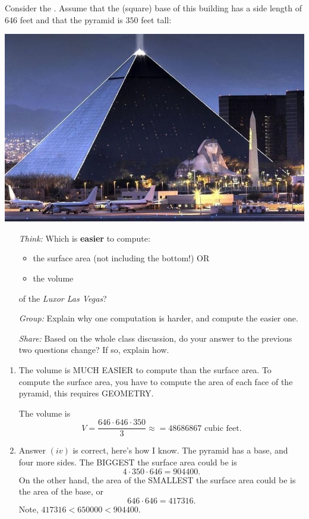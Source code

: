 \documentclass[handout,nooutcomes,noauthor,hints]{ximera}
\begin{document}


 \begin{question}   Consider the .  Assume that the (square) base of this building has a side length of
 $646$ feet and that the pyramid is $350$ feet tall:
  \begin{center}
    \includegraphics[width=.4\textwidth]{pyramid.jpg} 
  \end{center}

  \begin{enumerate}
  \item[ \emph{Think:}] Which is \textbf{easier} to compute:
    \begin{itemize}
    \item the surface area (not including the bottom!) OR
    \item the volume
    \end{itemize}
    of the \textit{Luxor Las Vegas}?
    
    \item[\emph{Group:}] Explain why one computation is
    harder, and compute the easier one.
    \item[\emph{Share:}] Based on the whole class discussion, do your answer to the previous two questions change?  If so, explain how.
        \end{enumerate}

   \begin{freeResponse}
    \begin{enumerate}
      \item The volume is MUCH EASIER to compute than the surface
        area. To compute the surface area, you have to compute the
        area of each face of the pyramid, this requires GEOMETRY.

        The volume is
        \[
        V = \frac{646\cdot 646\cdot 350}{3} \approx = 48686867 \text{ cubic feet}.
        \]
      \item Answer $(iv)$ is correct, here's how I know. The pyramid
        has a base, and four more sides. The BIGGEST the surface area could be is
        \[
        4\cdot 350\cdot 646 = 904400.
        \]
        On the other hand, the area of the SMALLEST the surface area could be is
        the area of the base, or
        \[
        646\cdot 646 = 417316.
        \]
        Note, $417316 < 650000 <  904400$.        
    \end{enumerate}
  \end{freeResponse}
\end{question}
\end{document}
